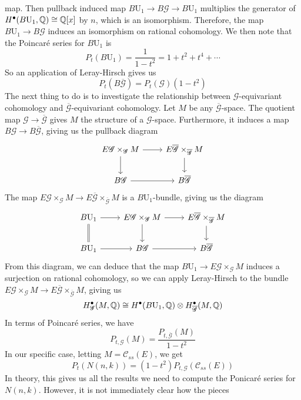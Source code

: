 map. Then pullback induced map $B \mathrm{U}_1 \to B\mathscr{G} \to B \mathrm{U}_1$
multiplies the generator of $H^\bullet(B \mathrm{U}_1, \mathbb{Q}) \cong \mathbb{Q}[x]$ by $n$,
which is an isomorphism. Therefore, the map $B \mathrm{U}_1 \to B\mathscr{G}$
induces an isomorphism on rational cohomology. We then note that the
Poincar\'e series for $B \mathrm{U}_1$ is
\[
P_t(B \mathrm{U}_1) = \frac{1}{1-t^2} = 1 + t^2 + t^4 + \cdots
\]
So an application of Leray-Hirsch gives us
\[
P_t(B\overline{\mathscr{G}}) = P_t(\mathscr{G})(1-t^2)
\]
The next thing to do is to investigate the relationship between
$\mathscr{G}$-equivariant cohomology and $\overline{\mathscr{G}}$-equivariant
cohomology. Let $M$ be any $\overline{\mathscr{G}}$-space. The quotient map
$\mathscr{G} \to \overline{\mathscr{G}}$ gives $M$ the structure of
a $\mathscr{G}$-space. Furthermore, it induces a map
$B\mathscr{G} \to B\overline{\mathscr{G}}$, giving us the pullback diagram
\[\begin{tikzcd}
E\mathscr{G} \times_{\mathscr{G}} M \ar[r] \ar[d] &
E\overline{\mathscr{G}} \times_{\overline{\mathscr{G}}} M \ar[d] \\
B\mathscr{G} \ar[r] & B\overline{\mathscr{G}}
\end{tikzcd}\]
The map $E\mathscr{G} \times_{\mathscr{G}} M
\to E\overline{\mathscr{G}} \times_{\overline{\mathscr{G}}} M$ is a
$B \mathrm{U}_1$-bundle, giving us the diagram
\[\begin{tikzcd}
B \mathrm{U}_1 \ar[r] \ar[d,equals]& E\mathscr{G} \times_{\mathscr{G}} M \ar[r] \ar[d] &
E\overline{\mathscr{G}} \times_{\overline{\mathscr{G}}} M \ar[d] \\
B \mathrm{U}_1 \ar[r] & B\mathscr{G} \ar[r] & B\overline{\mathscr{G}}
\end{tikzcd}\]
From this diagram, we can deduce that the map
$B \mathrm{U}_1 \to E\mathscr{G}\times_{\mathscr{G}} M$ induces a surjection
on rational cohomology, so we can apply Leray-Hirsch to the bundle
$E\mathscr{G} \times_{\mathscr{G}} M
\to E\overline{\mathscr{G}} \times_{\overline{\mathscr{G}}} M$,
giving us
\[
H^\bullet_{\mathscr{G}}(M,\mathbb{Q}) \cong
H^\bullet(B\mathrm{U}_1, \mathbb{Q}) \otimes H^\bullet_{\overline{\mathscr{G}}}(M,\mathbb{Q})
\]
In terms of Poincar\'e series, we have
\[
P_{t,\mathscr{G}}(M) = \frac{P_{t,\overline{\mathscr{G}}}(M)}{1-t^2}
\]
In our specific case, letting $M = \mathscr{C}_{ss}(E)$, we get
\[
P_t(N(n,k)) = (1-t^2)P_{t,\mathscr{G}}(\mathscr{C}_{ss}(E))
\]
In theory, this gives us all the results we need to compute the Ponicar\'e
series for $N(n,k)$. However, it is not immediately clear how the pieces

